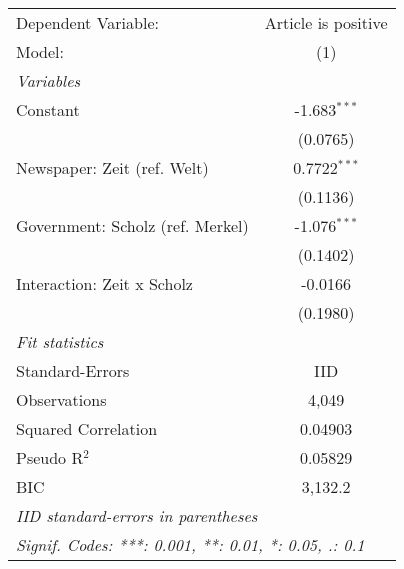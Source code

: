 
\begingroup
\centering
\begin{tabular}{lc}
   \tabularnewline \midrule \midrule
   Dependent Variable:              & Article is positive\\  
   Model:                           & (1)\\  
   \midrule
   \emph{Variables}\\
   Constant                         & -1.683$^{***}$\\   
                                    & (0.0765)\\   
   Newspaper: Zeit (ref. Welt)      & 0.7722$^{***}$\\   
                                    & (0.1136)\\   
   Government: Scholz (ref. Merkel) & -1.076$^{***}$\\   
                                    & (0.1402)\\   
   Interaction: Zeit x Scholz       & -0.0166\\   
                                    & (0.1980)\\   
   \midrule
   \emph{Fit statistics}\\
   Standard-Errors                  & IID \\   
   Observations                     & 4,049\\  
   Squared Correlation              & 0.04903\\  
   Pseudo R$^2$                     & 0.05829\\  
   BIC                              & 3,132.2\\  
   \midrule \midrule
   \multicolumn{2}{l}{\emph{IID standard-errors in parentheses}}\\
   \multicolumn{2}{l}{\emph{Signif. Codes: ***: 0.001, **: 0.01, *: 0.05, .: 0.1}}\\
\end{tabular}
\par\endgroup


